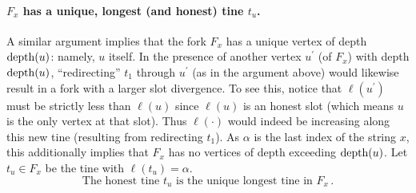     \paragraph{$F_x$ has a unique, longest (and honest) tine $t_u$.}
    A similar argument implies that the fork
    $F_x$ has a unique vertex of depth $\operatorname{depth}(u)$: namely, $u$ itself. In
    the presence of another vertex $u^\prime$ (of $F_x$) with depth
    $\operatorname{depth}(u)$, ``redirecting'' $t_1$ through $u^\prime$ (as in the
    argument above) would likewise result in a fork with 
    a larger slot divergence. 
    To see this, notice that $\ell(u^\prime)$ must be strictly less than $\ell(u)$ 
    since $\ell(u)$ is an honest slot (which means $u$ is the only vertex at that slot).
    Thus $\ell(\cdot)$ would indeed be increasing along
    this new tine (resulting from redirecting $t_1$).
    As $\alpha$ is the last index of the string $x$, this additionally
    implies that $F_x$ has no vertices of depth exceeding $\operatorname{depth}(u)$. 
    Let $t_u \in F_x$ be the tine with $\ell(t_u) = \alpha$. 
    \begin{equation}\label{eq:tu}
        \text{The honest tine $t_u$ is the unique longest tine in $F_x$}
        \,.
    \end{equation}
    


